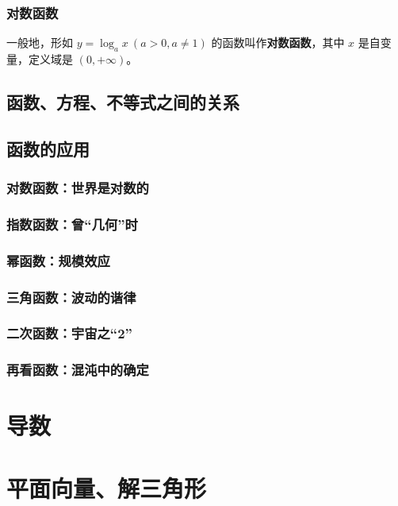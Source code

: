 \documentclass[a4paper,openany]{ctexbook}
\begin{document}
\subsection{对数函数}

一般地，形如 \(y=\log_a x\ (a>0,a\ne 1)\) 的函数叫作\textbf{对数函数}，其中 \(x\) 是自变量，定义域是 \((0,+\infty )\)。

\section{函数、方程、不等式之间的关系}

\section{函数的应用}

\subsection{对数函数：世界是对数的}

\subsection{指数函数：曾“几何”时}

\subsection{幂函数：规模效应}

\subsection{三角函数：波动的谐律}

\subsection{二次函数：宇宙之“2”}

\subsection{再看函数：混沌中的确定}

\chapter{导数}

\chapter{平面向量、解三角形}
\end{document}
